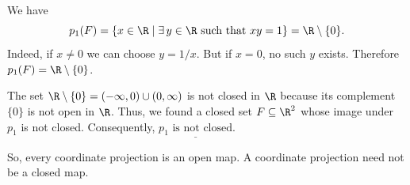 We have
\[ p_1(F)=\{x\in\R \mid \exists\,y\in\R \text{ such that } xy=1\}=\R\setminus\{0\}. \]
Indeed, if $x\neq0$ we can choose $y=1/x$. But if $x=0$, no such $y$ exists. Therefore
$p_1(F)=\R\setminus\{0\}$.

The set $\R\setminus\{0\}=(-\infty,0)\cup(0,\infty)$ is not closed in $\R$ because its
complement $\{0\}$ is not open in $\R$. Thus, we found a closed set $F\subseteq\R^2$ whose image
under $p_1$ is not closed. Consequently, $\underline{p_1 \text{ is not closed}}$.

So, every coordinate projection is an open map. A coordinate projection need not be a closed
map.
